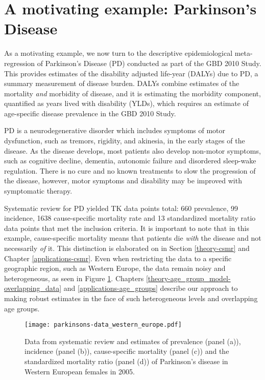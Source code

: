 \section{A motivating example: Parkinson's Disease}
\label{intro-complete_ex}

As a motivating example, we now turn to the descriptive epidemiological meta-regression of Parkinson's Disease (PD) conducted as part of the GBD 2010 Study.  This provides estimates of the disability adjusted life-year (DALYs) due to PD, a summary measurement of disease burden.  DALYs combine estimates of the mortality \emph{and} morbidity of disease, and it is estimating the morbidity component, quantified as years lived with disability (YLDs), which requires an estimate of age-specific disease prevalence in the GBD 2010 Study.

PD is a neurodegenerative disorder which includes symptoms of motor dysfunction, such as tremors, rigidity, and akinesia, in the early stages of the disease.  As the disease develops, most patients also develop non-motor symptoms, such as cognitive decline, dementia, autonomic failure and disordered sleep-wake regulation.  There is no cure and no known treatments to slow the progression of the disease, however, motor symptoms and disability may be improved with symptomatic therapy.\cite{poewe_natural_2006, pollock_prevalence_1966}

Systematic review for PD yielded TK data points total: 660 prevalence, 99 incidence, 1638 cause-specific mortality rate and 13 standardized mortality ratio data points that met the inclusion criteria.  It is important to note that in this example, cause-specific mortality means that patients die \emph{with} the disease and not necessarily \emph{of} it.  This distinction is elaborated on in Section \ref{theory-csmr} and Chapter \ref{applications-csmr}.  Even when restricting the data to a specific geographic region, such as Western Europe, the data remain noisy and heterogeneous, as seen in Figure \ref{fig:intro-parkinsons data}. Chapters \ref{theory-age_group_model-overlapping_data} and \ref{applications-age_groups} describe our approach to making robust estimates in the face of such heterogeneous levels and overlapping age groups.

    \begin{figure}[h]
        \begin{center}
            \texttt{[image: parkinsons-data\_western\_europe.pdf]}
            \caption{Data from systematic review and estimates of prevalence (panel (a)), incidence (panel (b)), cause-specific mortality (panel (c)) and the standardized mortality ratio (panel (d)) of Parkinson's disease in Western European females in 2005.}
            \label{fig:intro-parkinsons data}
        \end{center}
    \end{figure} 

